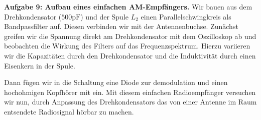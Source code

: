 \textbf{Aufgabe 9: Aufbau eines einfachen AM-Empfängers.} Wir bauen aus dem Drehkondensator ($500\si{\pico\farad}$) und der Spule $L_2$ einen Parallelschwingkreis als Bandpassfilter auf. Diesen verbinden wir mit der Antennenbuchse. Zunächst greifen wir die Spannung direkt am Drehkondensator mit dem Oszilloskop ab und beobachten die Wirkung des Filters auf das Frequenzspektrum. Hierzu variieren wir die Kapazitäten durch den Drehkondensator und die Induktivität durch einen Eisenkern in der Spule.

Dann fügen wir in die Schaltung eine Diode zur demodulation und einen hochohmigen Kopfhörer mit ein. Mit diesem einfachen Radioempfänger versuchen wir nun, durch Anpassung des Drehkondensators das von einer Antenne im Raum entsendete Radiosignal hörbar zu machen.
